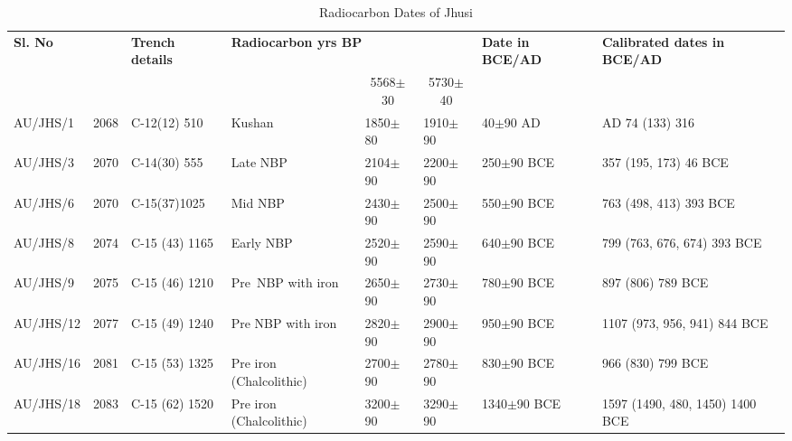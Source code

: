 {\setcounter{table}{0}
\renewcommand{\thetable}{III.\arabic{table}}
{\setlength\tabcolsep{2pt}
{\fontsize{7}{9}\selectfont
\begin{longtable}{|p{1.1cm}|c|p{1.4cm}|p{1cm}|p{.8cm}|p{.8cm}|p{1.1cm}|p{1.5cm}|}
\captionsetup{font=footnotesize}
\caption{Radiocarbon Dates of Jhusi}\label{table III.1}\\
\hline
\multicolumn{1}{|m{1.1cm}|}{\centering \textbf{Sl. No}}& & \multicolumn{1}{m{1.4cm}|}{\centering \textbf{Trench details}} & \multicolumn{3}{m{3cm}|}{\centering \textbf{Radiocarbon yrs BP}} & \multicolumn{1}{m{1.1cm}|}{\centering \textbf{Date in BCE/AD}} & \multicolumn{1}{m{1.5cm}|}{\centering \textbf{Calibrated dates in BCE/AD}}\\
& & &  \multicolumn{1}{c}{~~~~} & \multicolumn{1}{c}{5568$\pm$30} & \multicolumn{1}{c|}{5730$\pm$40} & & \\
\endfirsthead
\hline
\endhead
\hline
\endfoot
\hline
AU/JHS/1 & 2068 & C-12(12) 510 & Kushan & \hbox{1850$\pm$80} & \hbox{1910$\pm$90} & \hbox{40$\pm$90} AD & AD 74 (133) 316\\
AU/JHS/3 & 2070& C-14(30) 555 & Late NBP& 2104$\pm$90& 2200$\pm$90& 250$\pm$90 BCE& 357 (195, 173) 46 BCE\\
AU/JHS/6 & 2070 & C-15(37)1025 & Mid NBP& 2430$\pm$90& 2500$\pm$90& 550$\pm$90 BCE& 763 (498, 413) 393 BCE\\
AU/JHS/8 & 2074 & C-15 (43) 1165 & Early NBP & 2520$\pm$90 & 2590$\pm$90 & 640$\pm$90 BCE & 799 (763, 676, 674) 393 BCE\\
AU/JHS/9 & 2075 & C-15 (46) 1210 &  Pre~NBP with iron & 2650$\pm$90 & 2730$\pm$90 & 780$\pm$90 BCE & 897 (806) 789 BCE\\
AU/JHS/12 & 2077 & C-15 (49) 1240 & Pre NBP with iron  & 2820$\pm$90 & 2900$\pm$90 & 950$\pm$90 BCE & 1107 (973, 956, 941) 844 BCE\\
AU/JHS/16 & 2081 & C-15 (53) 1325 & Pre iron (Chalcolithic) & 2700$\pm$90 & 2780$\pm$90  & 830$\pm$90 BCE & 966 (830) 799 BCE\\
AU/JHS/18 & 2083 & C-15 (62) 1520  & Pre iron (Chalcolithic) & 3200$\pm$90 & 3290$\pm$90 &1340$\pm$90 BCE & 1597 (1490, 480, 1450) 1400 BCE\\
\end{longtable}
}}

\vspace{-.5cm}

}
